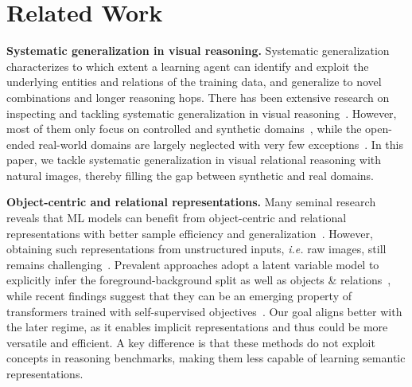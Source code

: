\documentclass{article} \usepackage{iclr2022_conference,times}
\renewcommand{\paragraph}[1]{\noindent\textbf{#1.}}
\begin{document}
\section{Related Work}
\vskip-0.1in
\label{sec:related_work}


\paragraph{Systematic generalization in visual reasoning} Systematic generalization~\citep{systematic1,systematic2} characterizes to which extent a learning agent can identify and exploit the underlying entities and relations of the training data, and generalize to novel combinations and longer reasoning hops. There has been extensive research on inspecting and tackling systematic generalization in visual reasoning~\citep{clevr,shape3d,dsprite,kuhnle2017shapeworld}. However, most of them only focus on controlled and synthetic domains~\citep{gscan,raven,pgm,halma,bongard-logo}, while the open-ended real-world domains are largely neglected with very few exceptions~\citep{zeroshothoi,vprom,bongard_hoi}. In this paper, we tackle systematic generalization in visual relational reasoning with natural images, thereby filling the gap between synthetic and real domains.

\paragraph{Object-centric and relational representations} Many seminal research reveals that ML models can benefit from object-centric and relational representations with better sample efficiency and generalization~\citep{phrases,oogen1,oogen4}. However, obtaining such representations from unstructured inputs, \emph{i.e.} raw images, still remains challenging~\citep{iodine,slotattention,disentanglebenchmark,yu2021unsupervised}. Prevalent approaches adopt a latent variable model to explicitly infer the foreground-background split as well as objects \& relations~\citep{air,space,aog}, while recent findings suggest that they can be an emerging property of transformers trained with self-supervised objectives~\citep{dino,esvit}. Our goal aligns better with the later regime, as it enables implicit representations and thus could be more versatile and efficient. A key difference is that these methods do not exploit concepts in reasoning benchmarks, making them less capable of learning semantic representations.
\end{document}
